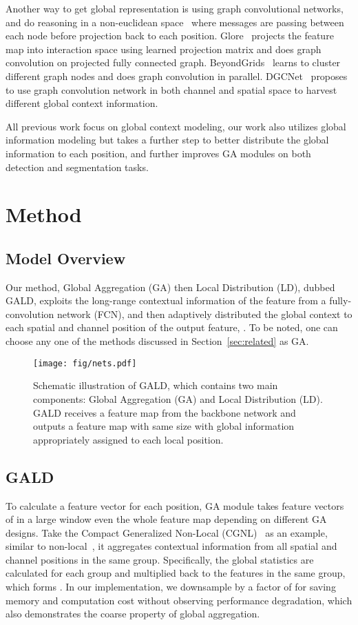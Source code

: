 \documentclass{bmvc2k}
\begin{document}
Another way to get global representation is using graph convolutional networks, and do reasoning in a non-euclidean space~\cite{zhang2019dynamic,zhangli_dgcn,beyond_grids,graph_reason} where messages are passing between each node before projection back to each position. 
Glore~\cite{graph_reason} projects the feature map into interaction space using learned projection matrix and does graph convolution on projected fully connected graph. BeyondGrids~\cite{beyond_grids} learns to cluster different graph nodes and does graph convolution in parallel. DGCNet~\cite{zhangli_dgcn} proposes to use graph convolution network in both channel and spatial space to harvest different global context information.


All previous work focus on global context modeling, our work also utilizes global information modeling but takes a further step to better distribute the global information to each position, and further improves GA modules on both detection and segmentation tasks. \section{Method}


\subsection{Model Overview}
Our method, Global Aggregation (GA) then Local Distribution (LD), dubbed GALD, exploits the long-range contextual information of the feature   from a fully-convolution network (FCN), and then adaptively distributed the global context to each spatial and channel position of the output feature, .
To be noted, one can choose any one of the methods discussed in Section~\ref{sec:related} as GA.



\begin{figure*}
\centering
\texttt{[image: fig/nets.pdf]}
\caption{Schematic illustration of GALD, which contains two main components: Global Aggregation (GA) and Local Distribution (LD). 
GALD receives a feature map from the backbone network and outputs a feature map with same size with global information appropriately assigned to each local position.
}
\label{fig:whole}
\end{figure*}

\subsection{GALD}
To calculate a feature vector for each position, GA module takes feature vectors of  in a large window even the whole feature map depending on different GA designs. Take the Compact Generalized Non-Local (CGNL)~\cite{cgnl} as an example, similar to non-local~\cite{Nonlocal}, it aggregates contextual information from all spatial and channel positions in the same group. 
Specifically,  the global statistics are calculated for each group and multiplied back to the features in the same group, which forms . In our implementation, we downsample  by a factor of  for saving memory and computation cost without observing performance degradation, which also demonstrates the coarse property of global aggregation. 
\end{document}
